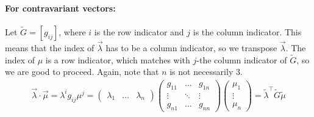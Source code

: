\documentclass{article}
\theoremstyle{definition}
\begin{document}
\paragraph{For contravariant vectors:\\}
Let $\tilde{G} = [g_{ij}]$, where $i$ is the row indicator and $j$ is the column indicator. This means that the index of $\vec{\lambda}$ has to be a column indicator, so we transpose $\vec{\lambda}$. The index of $\mu$ is a row indicator, which matches with $j$-the column indicator of $\tilde{G}$, so we are good to proceed. Again, note that $n$ is not necessarily 3.  
\begin{align*}
\boxed{
\vec{\lambda}\cdot\vec{\mu} = 
\lambda^ig_{ij}\mu^j
=
\begin{pmatrix}
\lambda_1 & \dots & \lambda_n
\end{pmatrix}
\begin{pmatrix}
g_{11} & \dots & g_{1n}\\
\vdots & \ddots & \vdots \\
g_{n1} & \dots & g_{nn}
\end{pmatrix}
\begin{pmatrix}
\mu_1 \\
\vdots\\
\mu_n
\end{pmatrix}
=
\tilde{\lambda}^\top \tilde{G} \tilde{\mu}}
\end{align*}
\end{document}
